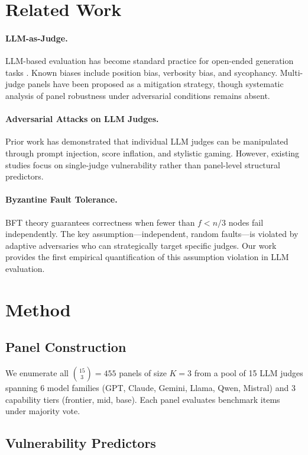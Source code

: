 \documentclass[11pt,a4paper]{article}
\begin{document}
\section{Related Work}

\paragraph{LLM-as-Judge.} LLM-based evaluation has become standard practice for open-ended generation tasks \cite{zheng2023judging}. Known biases include position bias, verbosity bias, and sycophancy. Multi-judge panels have been proposed as a mitigation strategy, though systematic analysis of panel robustness under adversarial conditions remains absent.

\paragraph{Adversarial Attacks on LLM Judges.} Prior work has demonstrated that individual LLM judges can be manipulated through prompt injection, score inflation, and stylistic gaming. However, existing studies focus on single-judge vulnerability rather than panel-level structural predictors.

\paragraph{Byzantine Fault Tolerance.} BFT theory guarantees correctness when fewer than $f < n/3$ nodes fail independently. The key assumption---independent, random faults---is violated by adaptive adversaries who can strategically target specific judges. Our work provides the first empirical quantification of this assumption violation in LLM evaluation.

\section{Method}

\subsection{Panel Construction}

We enumerate all $\binom{15}{3} = 455$ panels of size $K=3$ from a pool of 15 LLM judges spanning 6 model families (GPT, Claude, Gemini, Llama, Qwen, Mistral) and 3 capability tiers (frontier, mid, base). Each panel evaluates benchmark items under majority vote.

\subsection{Vulnerability Predictors}
\end{document}

